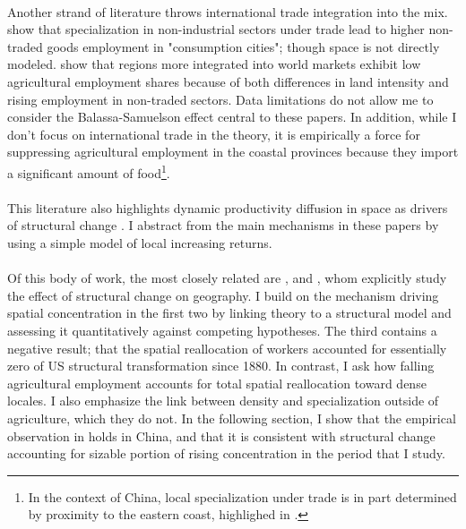 \documentclass[]{article}
\theoremstyle{plain}
\begin{document}
\paragraph*{}
Another strand of literature throws international trade integration into the mix. \citet{urbwoindustrialization} show that specialization in non-industrial sectors under trade lead to higher non-traded goods employment in "consumption cities"; though space is not directly modeled. \citet{rfargentina} show that regions more integrated into world markets exhibit low agricultural employment shares because of both differences in land intensity and rising employment in non-traded sectors. Data limitations do not allow me to consider the Balassa-Samuelson effect central to these papers. In addition, while I don't focus on international trade in the theory, it is empirically a force for suppressing agricultural employment in the coastal provinces because they import a significant amount of food\footnote{In the context of China, local specialization under trade is in part determined by proximity to the eastern coast, highlighed in \cite{cosarfagjelbaum}.}.
\paragraph*{}
This literature also highlights dynamic productivity diffusion in space as drivers of structural change \citep{spatdev}  \citep{delventhalglobenet}. I abstract from the main mechanisms in these papers by using a simple model of local increasing returns. 
\paragraph*{}
Of this body of work, the most closely related are \citet{urbstruct}, \citet{MURATA2008} and \citet{eckertpeters}, whom explicitly study the effect of structural change on geography. I build on the mechanism driving spatial concentration in the first two by linking theory to a structural model and assessing it quantitatively against competing hypotheses. The third contains a negative result; that the spatial reallocation of workers accounted for essentially zero of US structural transformation since 1880. In contrast, I ask how falling agricultural employment accounts for total spatial reallocation toward dense locales. I also emphasize the link between density and specialization outside of agriculture, which they do not. In the following section, I show that the empirical observation in \cite{eckertpeters} holds in China, and that it is consistent with structural change accounting for sizable portion of rising concentration in the period that I study. 
\end{document}
